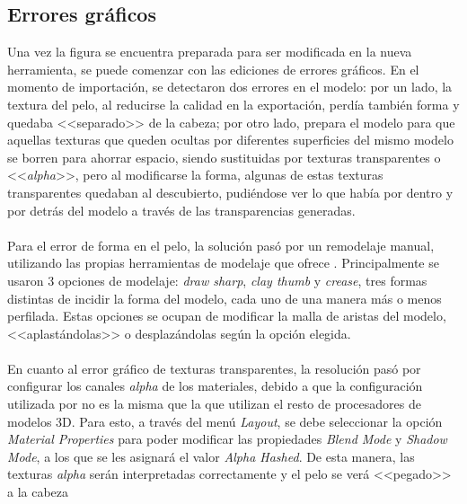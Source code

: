 \documentclass{subfiles}
\begin{document}
    \subsection{Errores gráficos}
    \label{sec:errores_graficos}
    Una vez la figura se encuentra preparada para ser modificada en la nueva herramienta, se puede comenzar con las ediciones de errores gráficos. En el momento de importación, se detectaron dos errores en el modelo: por un lado, la textura del pelo, al reducirse la calidad en la exportación, perdía también forma y quedaba <<separado>> de la cabeza; por otro lado, \makehuman prepara el modelo para que aquellas texturas que queden ocultas por diferentes superficies del mismo modelo se borren para ahorrar espacio, siendo sustituidas por texturas transparentes o <<\textit{alpha}>>, pero al modificarse la forma, algunas de estas texturas transparentes quedaban al descubierto, pudiéndose ver lo que había por dentro y por detrás del modelo a través de las transparencias generadas.

    \paragraph{}
    Para el error de forma en el pelo, la solución pasó por un remodelaje manual, utilizando las propias herramientas de modelaje que ofrece \blender. Principalmente se usaron 3 opciones de modelaje: \textit{draw sharp}, \textit{clay thumb} y \textit{crease}, tres formas distintas de incidir la forma del modelo, cada uno de una manera más o menos perfilada. Estas opciones se ocupan de modificar la malla de aristas del modelo, <<aplastándolas>> o desplazándolas según la opción elegida.

    \paragraph{}
    En cuanto al error gráfico de texturas transparentes, la resolución pasó por configurar los canales \textit{alpha} de los materiales, debido a que la configuración utilizada por \makehuman no es la misma que la que utilizan el resto de procesadores de modelos 3D. Para esto, a través del menú \textit{Layout}, se debe seleccionar la opción \textit{Material Properties} para poder modificar las propiedades \textit{Blend Mode} y \textit{Shadow Mode}, a los que se les asignará el valor \textit{Alpha Hashed}. De esta manera, las texturas \textit{alpha} serán interpretadas correctamente y el pelo se verá <<pegado>> a la cabeza
\end{document}
